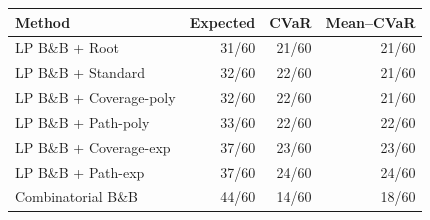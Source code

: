 \begin{tabular}{lrrr}
\toprule
Method & Expected & CVaR & Mean--CVaR \\
\midrule
LP B\&B + Root & 31/60 & 21/60 & 21/60 \\
LP B\&B + Standard & 32/60 & 22/60 & 21/60 \\
LP B\&B + Coverage-poly & 32/60 & 22/60 & 21/60 \\
LP B\&B + Path-poly & 33/60 & 22/60 & 22/60 \\
LP B\&B + Coverage-exp & 37/60 & 23/60 & 23/60 \\
LP B\&B + Path-exp & 37/60 & 24/60 & 24/60 \\
Combinatorial B\&B & 44/60 & 14/60 & 18/60 \\
\bottomrule
\end{tabular}

